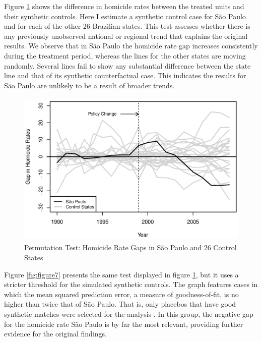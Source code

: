 Figure \ref{fig:figure6} shows the difference in homicide rates between the treated units and their synthetic controls. Here I estimate a synthetic control case for São Paulo and for each of the other 26 Brazilian states. This test assesses whether there is any previously unobserved national or regional trend that explains the original results. We observe that in São Paulo the homicide rate gap increases consistently during the treatment period, whereas the lines for the other states are moving randomly. Several lines fail to show any substantial difference between the state line and that of its synthetic counterfactual case. This indicates the results for São Paulo are unlikely to be a result of broader trends.

\begin{figure}[H]
    \centering
    \includegraphics[height=7.5cm]{images/permutation-gaps2.eps}
    \caption{Permutation Test: Homicide Rate Gaps in São Paulo and 26 Control States}
    \label{fig:figure6}
\end{figure}

Figure \ref{fig:figure7} presents the same test displayed in figure \ref{fig:figure6}, but it uses a stricter threshold for the simulated synthetic controls. The graph features cases in which the mean squared prediction error, a measure of goodness-of-fit, is no higher than twice that of São Paulo. That is, only placebos that have good synthetic matches were selected for the analysis \citep[p. 503]{abadie2010}.  In this group, the negative gap for the homicide rate São Paulo is by far the most relevant, providing further evidence for the original findings.

